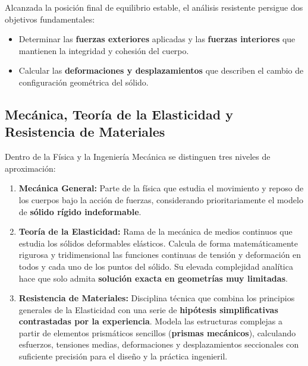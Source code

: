 Alcanzada la posición final de equilibrio estable, el análisis resistente persigue dos objetivos fundamentales:

\begin{itemize}

    \item Determinar las \textbf{fuerzas exteriores} aplicadas y las \textbf{fuerzas interiores} que mantienen la integridad y cohesión del cuerpo.

    \item Calcular las \textbf{deformaciones y desplazamientos} que describen el cambio de configuración geométrica del sólido.

\end{itemize}



\subsection{Mecánica, Teoría de la Elasticidad y Resistencia de Materiales}

Dentro de la Física y la Ingeniería Mecánica se distinguen tres niveles de aproximación:

\begin{enumerate}

    \item \textbf{Mecánica General:} Parte de la física que estudia el movimiento y reposo de los cuerpos bajo la acción de fuerzas, considerando prioritariamente el modelo de \textbf{sólido rígido indeformable}.

    \item \textbf{Teoría de la Elasticidad:} Rama de la mecánica de medios continuos que estudia los sólidos deformables elásticos. Calcula de forma matemáticamente rigurosa y tridimensional las funciones continuas de tensión y deformación en todos y cada uno de los puntos del sólido. Su elevada complejidad analítica hace que solo admita \textbf{solución exacta en geometrías muy limitadas}.

    \item \textbf{Resistencia de Materiales:} Disciplina técnica que combina los principios generales de la Elasticidad con una serie de \textbf{hipótesis simplificativas contrastadas por la experiencia}. Modela las estructuras complejas a partir de elementos prismáticos sencillos (\textbf{prismas mecánicos}), calculando esfuerzos, tensiones medias, deformaciones y desplazamientos seccionales con suficiente precisión para el diseño y la práctica ingenieril.

\end{enumerate}



